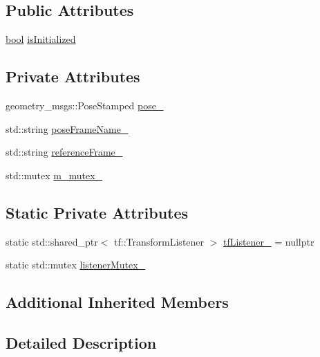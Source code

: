 \subsection*{Public Attributes}
\begin{DoxyCompactItemize}
\item 
\hyperlink{classbool}{bool} \hyperlink{classcl__move__base__z_1_1Pose_a49df3a978021edb71a48ef5e6d8e75a8}{is\+Initialized}
\end{DoxyCompactItemize}
\subsection*{Private Attributes}
\begin{DoxyCompactItemize}
\item 
geometry\+\_\+msgs\+::\+Pose\+Stamped \hyperlink{classcl__move__base__z_1_1Pose_a9da7acf880968a3c220b8436fd0bb6ef}{pose\+\_\+}
\item 
std\+::string \hyperlink{classcl__move__base__z_1_1Pose_a4f45be8e2fd73e618d815582a4ca8efe}{pose\+Frame\+Name\+\_\+}
\item 
std\+::string \hyperlink{classcl__move__base__z_1_1Pose_a6a7a593232b6edaf99103d48ad8da9d3}{reference\+Frame\+\_\+}
\item 
std\+::mutex \hyperlink{classcl__move__base__z_1_1Pose_a73ed2daba3e473e156cab751fb37b58f}{m\+\_\+mutex\+\_\+}
\end{DoxyCompactItemize}
\subsection*{Static Private Attributes}
\begin{DoxyCompactItemize}
\item 
static std\+::shared\+\_\+ptr$<$ tf\+::\+Transform\+Listener $>$ \hyperlink{classcl__move__base__z_1_1Pose_a188a5ac62d5424c1eacd667868049962}{tf\+Listener\+\_\+} = nullptr
\item 
static std\+::mutex \hyperlink{classcl__move__base__z_1_1Pose_ae1b5ee53f49d74926e04a477d792f1d0}{listener\+Mutex\+\_\+}
\end{DoxyCompactItemize}
\subsection*{Additional Inherited Members}


\subsection{Detailed Description}


